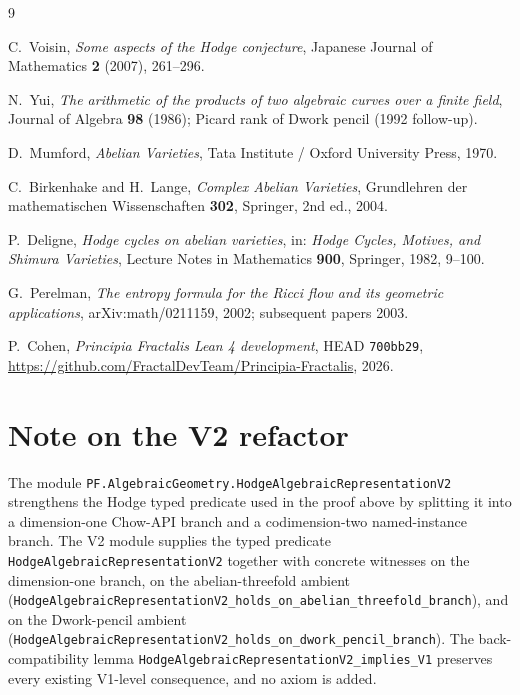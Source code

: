 \documentclass[11pt,a4paper]{article}
\theoremstyle{plain}
\theoremstyle{definition}
\begin{document}
\begin{thebibliography}{9}

C.~Voisin,
\emph{Some aspects of the Hodge conjecture},
Japanese Journal of Mathematics \textbf{2} (2007), 261--296.

N.~Yui,
\emph{The arithmetic of the products of two algebraic curves over a
finite field},
Journal of Algebra \textbf{98} (1986); Picard rank of Dwork pencil
(1992 follow-up).

D.~Mumford,
\emph{Abelian Varieties},
Tata Institute / Oxford University Press, 1970.

C.~Birkenhake and H.~Lange,
\emph{Complex Abelian Varieties},
Grundlehren der mathematischen Wissenschaften \textbf{302},
Springer, 2nd ed., 2004.

P.~Deligne,
\emph{Hodge cycles on abelian varieties},
in: \emph{Hodge Cycles, Motives, and Shimura Varieties},
Lecture Notes in Mathematics \textbf{900}, Springer, 1982,
9--100.

G.~Perelman,
\emph{The entropy formula for the Ricci flow and its geometric
applications},
arXiv:math/0211159, 2002; subsequent papers 2003.

P.~Cohen,
\emph{Principia Fractalis Lean 4 development},
HEAD \texttt{700bb29},
\url{https://github.com/FractalDevTeam/Principia-Fractalis}, 2026.

\end{thebibliography}

\section*{Note on the V2 refactor}

The module
\texttt{PF.AlgebraicGeometry.HodgeAlgebraicRepresentationV2}
strengthens the Hodge typed predicate used in the proof above by
splitting it into a dimension-one Chow-API branch and a
codimension-two named-instance branch.  The V2 module supplies the
typed predicate
\texttt{HodgeAlgebraicRepresentationV2} together with concrete
witnesses on the dimension-one branch, on the abelian-threefold
ambient (\texttt{HodgeAlgebraicRepresentationV2\_holds\_on\_abelian\_threefold\_branch}),
and on the Dwork-pencil ambient
(\texttt{HodgeAlgebraicRepresentationV2\_holds\_on\_dwork\_pencil\_branch}).
The back-compatibility lemma
\texttt{HodgeAlgebraicRepresentationV2\_implies\_V1} preserves every
existing V1-level consequence, and no axiom is added.
\end{document}
